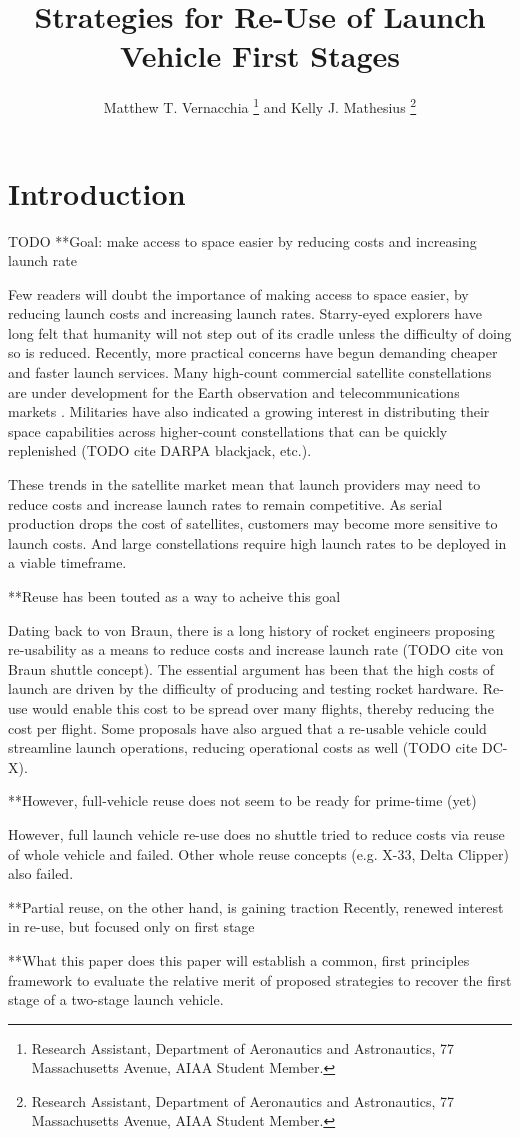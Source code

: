 \documentclass[conf]{new-aiaa}
\title{Strategies for Re-Use of Launch Vehicle First Stages}
\author{Matthew T. Vernacchia \footnote{Research Assistant, Department of Aeronautics and Astronautics, 77 Massachusetts Avenue, AIAA Student Member.}
and Kelly J. Mathesius  \footnote{Research Assistant, Department of Aeronautics and Astronautics, 77 Massachusetts Avenue, AIAA Student Member.}}
\affil{Massachusetts Institute of Technology, Cambridge, MA, 02139}
\begin{document}
\maketitle

\section{Introduction}

TODO
**Goal: make access to space easier by reducing costs and increasing launch rate

Few readers will doubt the importance of making access to space easier, by reducing launch costs and increasing launch rates. Starry-eyed explorers have long felt that humanity will not step out of its cradle unless the difficulty of doing so is reduced. Recently, more practical concerns have begun demanding cheaper and faster launch services. Many high-count commercial satellite constellations are under development for the Earth observation and telecommunications markets \cite{SIA2017, Henry2017}. Militaries have also indicated a growing interest in distributing their space capabilities across higher-count constellations that can be quickly replenished (TODO cite DARPA blackjack, etc.).

These trends in the satellite market mean that launch providers may need to reduce costs and increase launch rates to remain competitive. As serial production drops the cost of satellites, customers may become more sensitive to launch costs. And large constellations require high launch rates to be deployed in a viable timeframe.


**Reuse has been touted as a way to acheive this goal

Dating back to von Braun, there is a long history of rocket engineers proposing re-usability as a means to reduce costs and increase launch rate (TODO cite von Braun shuttle concept). The essential argument has been that the high costs of launch are driven by the difficulty of producing and testing rocket hardware. Re-use would enable this cost to be spread over many flights, thereby reducing the cost per flight. Some proposals have also argued that a re-usable vehicle could streamline launch operations, reducing operational costs as well (TODO cite DC-X).


**However, full-vehicle reuse does not seem to be ready for prime-time (yet)

However, full launch vehicle re-use does no
shuttle tried to reduce costs via reuse of whole vehicle and failed. Other whole reuse concepts (e.g. X-33, Delta Clipper) also failed.

**Partial reuse, on the other hand, is gaining traction
Recently, renewed interest in re-use, but focused only on first stage

**What this paper does
this paper will establish a common, first principles framework to evaluate the relative merit of proposed strategies to recover the first stage of a two-stage launch vehicle. 



\end{document}
